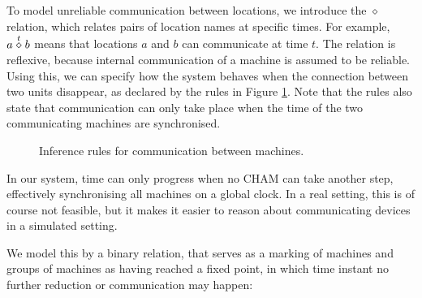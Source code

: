 To model unreliable communication between locations, we introduce the
$\diamond$ relation, which relates pairs of location names at specific times.
For example, $a \stackrel{t}{\diamond} b$ means that locations $a$ and $b$ can
communicate at time $t$. The relation is reflexive, because internal
communication of a machine is assumed to be reliable. Using this, we can
specify how the system behaves when the connection between two units disappear,
as declared by the rules in Figure \ref{fig:rule:coms}. Note that the rules
also state that communication can only take place when the time of the two
communicating machines are synchronised.
\begin{figure}[!h]
\caption{Inference rules for communication between machines.}\label{fig:rule:coms}
\end{figure}

In our system, time can only progress when no CHAM can take another step,
effectively synchronising all machines on a global clock. In a real setting,
this is of course not feasible, but it makes it easier to reason about
communicating devices in a simulated setting.

We model this by a binary relation, that serves as a marking of machines and
groups of machines as having reached a fixed point, in which time instant no
further reduction or communication may happen:

